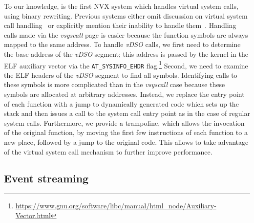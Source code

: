 To our knowledge, \varan is the first NVX system which handles virtual system
calls, using binary rewriting.  Previous systems either omit discussion on
virtual system call handling~\cite{orchestra11} or explicitly mention their
inability to handle them~\cite{tachyon12}.
Handling calls made via the \textit{vsyscall} page is easier because
the function symbols are always mapped to the same address.  
To handle \textit{vDSO} calls, we first need to determine the base
address of the \textit{vDSO} segment; this address is passed by the
kernel in the ELF auxiliary vector via the \lstinline`AT_SYSINFO_EHDR`
flag.\footnote{\url{https://www.gnu.org/software/libc/manual/html_node/Auxiliary-Vector.html}}
Second, we need to examine the ELF headers of the \textit{vDSO}
segment to find all symbols.  Identifying calls to these symbols is
more complicated than in the \textit{vsyscall} case because these
symbols are allocated at arbitrary addresses.  Instead, we replace the
entry point of each function with a jump to dynamically generated code
which sets up the stack and then issues a call to the \varan system
call entry point as in the case of regular system calls. Furthermore, we
provide a trampoline, which allows the invocation of the original
function, by moving the first few instructions of each function to a
new place, followed by a jump to the original code. This allows \varan
to take advantage of the virtual system call mechanism to further
improve performance.




\subsection{Event streaming}
\label{sec:streaming}


